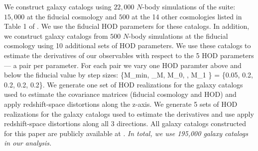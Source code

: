 We construct galaxy catalogs using $22,000$ $N$-body simulations of the \quij
suite: $15,000$ at the fiducial cosmology and $500$ at the 14 other cosmologies
listed in Table 1 of \cite{hahn2019}. We use the fiducial HOD parameters for
these catalogs. In addition, we construct galaxy catalogs from $500$ $N$-body
simulations at the fiducial cosmology using 10 additional sets of HOD
parameters. We use these catalogs to estimate the derivatives of our observables
with respect to the 5 HOD parameters --- a pair per parameter. For each pair we
vary one HOD paramter above and below the fiducial value by step sizes: 
\beq
\{\Delta M_{\rm min}, \Delta \sigma_{\log M}, \Delta \log M_0, \Delta \alpha,
\Delta \log M_1 \} = \{0.05, 0.2, 0.2, 0.2, 0.2\}.
\eeq
We generate one set of
HOD realizations for the galaxy catalogs used to estimate the covariance matrices
(fiducial cosmology and HOD) and apply redshift-space distortions along the
z-axis. We generate 5 sets of HOD realizations for the galaxy catalogs used to
estimate the derivatives and use apply redshift-space distortions along all
3 directions. All galaxy catalogs constructed for this paper are publicly available
at .
{\em In total, we use 195,000 galaxy catalogs in our analysis.}

